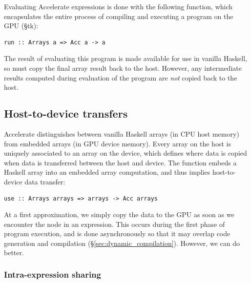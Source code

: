 Evaluating Accelerate expressions is done with the following function, which
encapsulates the entire process of compiling and executing a program on the GPU
(\S tk):
%
\begin{lstlisting}[style=haskell,numbers=none]
    run :: Arrays a => Acc a -> a
\end{lstlisting}
%
The result of evaluating this program is made available for use in vanilla
Haskell, so  must copy the final array result back to the host.
However, any intermediate results computed during evaluation of the program are
\emph{not} copied back to the host.


\subsection{Host-to-device transfers}

Accelerate distinguishes between vanilla Haskell arrays (in CPU host memory)
from embedded arrays (in GPU device memory). Every array on the host is uniquely
associated to an array on the device, which defines where data is copied when
data is transferred between the host and device. The function  embeds
a Haskell array into an embedded array computation, and thus implies
host-to-device data transfer:
%
\begin{lstlisting}[style=haskell,numbers=none]
    use :: Arrays arrays => arrays -> Acc arrays
\end{lstlisting}
%

At a first approximation, we simply copy the data to the GPU as soon as we
encounter the  node in an expression. This occurs during the first
phase of program execution, and is done asynchronously so that it may overlap
code generation and compilation (\S\ref{sec:dynamic_compilation}). However, we
can do better.

\subsubsection{Intra-expression sharing}

